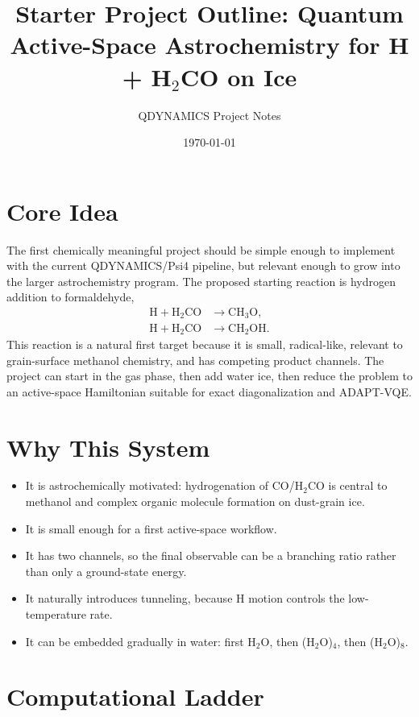 \documentclass[11pt]{article}
\title{Starter Project Outline: Quantum Active-Space Astrochemistry for H + H$_2$CO on Ice}
\author{QDYNAMICS Project Notes}
\date{\today}
\begin{document}
\maketitle

\section{Core Idea}

The first chemically meaningful project should be simple enough to implement with the current
QDYNAMICS/Psi4 pipeline, but relevant enough to grow into the larger astrochemistry program.
The proposed starting reaction is hydrogen addition to formaldehyde,
\begin{align}
  \mathrm{H + H_2CO} &\rightarrow \mathrm{CH_3O}, \\
  \mathrm{H + H_2CO} &\rightarrow \mathrm{CH_2OH}.
\end{align}
This reaction is a natural first target because it is small, radical-like, relevant to grain-surface
methanol chemistry, and has competing product channels. The project can start in the gas phase,
then add water ice, then reduce the problem to an active-space Hamiltonian suitable for exact
diagonalization and ADAPT-VQE.

\section{Why This System}

\begin{itemize}[leftmargin=*]
  \item It is astrochemically motivated: hydrogenation of CO/H$_2$CO is central to methanol and complex organic molecule formation on dust-grain ice.
  \item It is small enough for a first active-space workflow.
  \item It has two channels, so the final observable can be a branching ratio rather than only a ground-state energy.
  \item It naturally introduces tunneling, because H motion controls the low-temperature rate.
  \item It can be embedded gradually in water: first H$_2$O, then (H$_2$O)$_4$, then (H$_2$O)$_8$.
\end{itemize}

\section{Computational Ladder}
\end{document}
